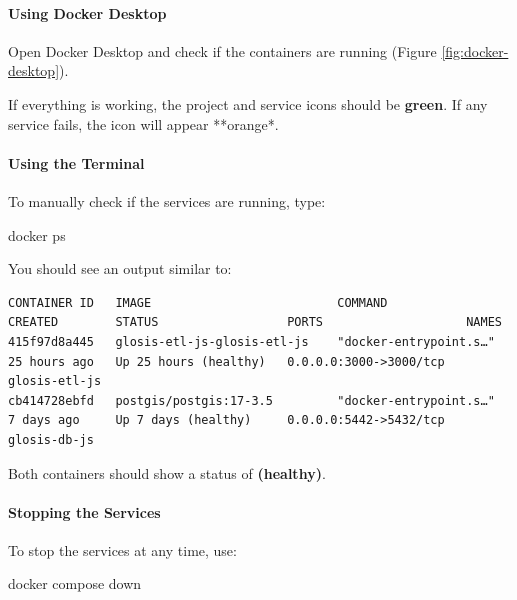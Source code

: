 \documentclass[
  10pt,
  b5paper,
  oneside]{book}
\newenvironment{Shaded}{\begin{snugshade}}{\end{snugshade}}
\newcommand{\ExtensionTok}[1]{#1}
\newcommand{\NormalTok}[1]{#1}
\begin{document}
\paragraph*{Using Docker Desktop}\label{using-docker-desktop}

Open Docker Desktop and check if the containers are running (Figure \ref{fig:docker-desktop}).

If everything is working, the project and service icons should be \textbf{green}. If any service fails, the icon will appear **orange*.

\paragraph*{Using the Terminal}\label{using-the-terminal}

To manually check if the services are running, type:

\begin{Shaded}
\begin{Highlighting}[]
\ExtensionTok{docker}\NormalTok{ ps}
\end{Highlighting}
\end{Shaded}

You should see an output similar to:

\begin{verbatim}
CONTAINER ID   IMAGE                          COMMAND                  CREATED        STATUS                  PORTS                    NAMES
415f97d8a445   glosis-etl-js-glosis-etl-js    "docker-entrypoint.s…"   25 hours ago   Up 25 hours (healthy)   0.0.0.0:3000->3000/tcp   glosis-etl-js
cb414728ebfd   postgis/postgis:17-3.5         "docker-entrypoint.s…"   7 days ago     Up 7 days (healthy)     0.0.0.0:5442->5432/tcp   glosis-db-js
\end{verbatim}

Both containers should show a status of \textbf{(healthy)}.

\paragraph*{Stopping the Services}\label{stopping-the-services}

To stop the services at any time, use:

\begin{Shaded}
\begin{Highlighting}[]
\ExtensionTok{docker}\NormalTok{ compose down}
\end{Highlighting}
\end{Shaded}
\end{document}
